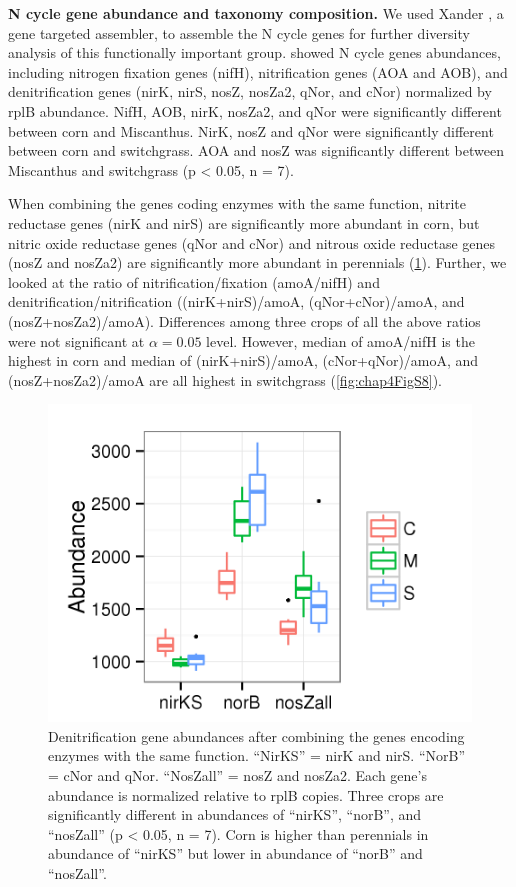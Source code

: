 \documentclass[]{msu-thesis}
\begin{document}
\textbf{N cycle gene abundance and taxonomy composition. }
We used Xander \cite{wang_xander:_2015}, a gene targeted assembler, to assemble the N cycle genes for further diversity analysis of this functionally important group.  showed N cycle genes abundances, including nitrogen fixation genes (nifH), nitrification genes (AOA and AOB), and denitrification genes (nirK, nirS, nosZ, nosZa2, qNor, and cNor) normalized by rplB abundance. NifH, AOB, nirK, nosZa2, and qNor were significantly different between corn and Miscanthus. NirK, nosZ and qNor were significantly different between corn and switchgrass. AOA and nosZ was significantly different between Miscanthus and switchgrass (p < 0.05, n = 7).

When combining the genes coding enzymes with the same function, nitrite reductase genes (nirK and nirS) are significantly more abundant in corn, but nitric oxide reductase genes (qNor and cNor) and nitrous oxide reductase genes (nosZ and nosZa2) are significantly more abundant in perennials (\cref{fig:chap4Fig5}). Further, we looked at the ratio of nitrification/fixation (amoA/nifH) and denitrification/nitrification ((nirK+nirS)/amoA, (qNor+cNor)/amoA, and (nosZ+nosZa2)/amoA). Differences among three crops of all the above ratios were not significant at $\alpha = 0.05$ level. However, median of amoA/nifH is the highest in corn and median of (nirK+nirS)/amoA, (cNor+qNor)/amoA, and (nosZ+nosZa2)/amoA are all highest in switchgrass (\cref{fig:chap4FigS8}).



\begin{figure}[tbph!]
  \centering
  \includegraphics[scale=1]{figs/chap4-xander-denitrify-abun-merge-pair}
  \caption[]{Denitrification gene abundances after combining the genes encoding enzymes with the same function. ``NirKS'' = nirK and nirS. ``NorB'' = cNor and qNor. ``NosZall'' = nosZ and nosZa2. Each gene’s abundance is normalized relative to rplB copies. Three crops are significantly different in abundances of “nirKS”, ``norB'', and ``nosZall'' (p < 0.05, n = 7). Corn is higher than perennials in abundance of ``nirKS'' but lower in abundance of ``norB'' and ``nosZall''.}
  \label{fig:chap4Fig5}
\end{figure}
\end{document}
